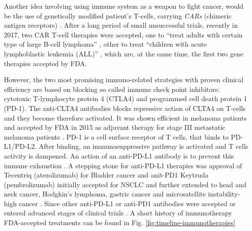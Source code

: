 \documentclass[12pt,]{book}
\theoremstyle{definition}
\theoremstyle{definition}
\theoremstyle{definition}
\theoremstyle{remark}
\begin{document}
Another idea involving using immune system as a weapon to fight cancer,
would be the use of genetically modified patient's T-cells, carrying
\emph{CARs} (chimeric antigen receptors) \citep{Jackson2016}. After a
long period of small unsuccessful trials, recently in 2017, two CAR
T-cell therapies were accepted, one to ``treat adults with certain type
of large B-cell lymphoma'' \citep{FDACARTadult}, other to treat
``children with acute lymphoblastic leukemia (ALL)'' \citep{FDACARTALL}
, which are, at the same time, the first two gene therapies accepted by
FDA.

However, the two most promising immuno-related strategies with proven
clinical efficiency are based on blocking so called immune check point
inhibitors: cytotoxic T-lymphocyte protein 4 (CTLA4) and programmed cell
death protein 1 (PD-1). The anti-CLTA4 antibodies blocks repressive
action of CLTA4 on T-cells and they become therefore activated. It was
shown efficient in melanoma patients and accepted by FDA in 2015 as
adjuvant therapy for stage III metastatic melanoma patients
\citep{FDACTLA4}. PD-1 is a cell surface receptor of T cells, that binds
to PD-L1/PD-L2. After binding, an immunosuppressive pathway is activated
and T cells activity is dampened. An action of an anti-PD-L1 antibody is
to prevent this immune exhaustion \citep{Chen2017}. A stepping stone for
anti-PD-L1 therapies was approval of Tecentriq (atezolizumab) for
Bladder cancer \citep{FDAPDL1Bladder} and anit-PD1 Keytruda
(pembrolizumab) initially accepted for NSCLC and further extended to
head and neck cancer, Hodgkin's lymphoma, gastric cancer and
microsatellite instability-high cancer \citep{FDAPDL1NSCLC}. Since other
anti-PD-L1 or anti-PD1 antibodies were accepted or entered advanced
stages of clinical trials \citep{Wolchok2015}. A short history of
immunotherapy FDA-accepted treatments can be found in Fig.
\ref{fig:timeline-immunotherapies}
\end{document}
